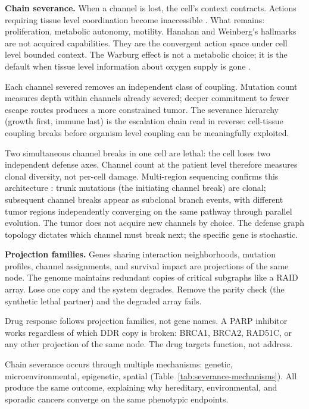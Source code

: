 \documentclass[11pt]{article}
\begin{document}
\textbf{Chain severance.}
When a channel is lost, the cell's context contracts. Actions
requiring tissue level coordination become inaccessible
\cite{McCarthy2026_BCA}. What remains: proliferation,
metabolic autonomy, motility. Hanahan and Weinberg's hallmarks
\cite{Hanahan2011} are not acquired capabilities. They are the
convergent action space under cell level bounded context. The
Warburg effect is not a metabolic choice; it is the default when
tissue level information about oxygen supply is gone
\cite{Warburg1956}.

Each channel severed removes an independent class of coupling.
Mutation count measures depth within channels already severed;
deeper commitment to fewer escape routes produces a more
constrained tumor. The severance hierarchy (growth first, immune
last) is the escalation chain read in reverse: cell-tissue coupling
breaks before organism level coupling can be meaningfully exploited.

Two simultaneous channel breaks in one cell are lethal: the cell
loses two independent defense axes. Channel count at the patient
level therefore measures clonal diversity, not per-cell damage.
Multi-region sequencing confirms this architecture
\cite{Gerlinger2012, JamalHanjani2017}: trunk mutations (the
initiating channel break) are clonal; subsequent channel breaks
appear as subclonal branch events, with different tumor regions
independently converging on the same pathway through parallel
evolution. The tumor does not acquire new channels by choice. The
defense graph topology dictates which channel must break next; the
specific gene is stochastic.

\textbf{Projection families.}
Genes sharing interaction neighborhoods, mutation profiles, channel
assignments, and survival impact are projections of the same node.
The genome maintains redundant copies of critical subgraphs like a
RAID array. Lose one copy and the system degrades. Remove the parity
check (the synthetic lethal partner) and the degraded array fails.

Drug response follows projection families, not gene names. A PARP
inhibitor works regardless of which DDR copy is broken: BRCA1,
BRCA2, RAD51C, or any other projection of the same node. The drug
targets function, not address.

Chain severance occurs through multiple mechanisms: genetic, micro\-environmental,
epigenetic, spatial (Table~\ref{tab:severance-mechanisms}). All
produce the same outcome, explaining why hereditary, environmental,
and sporadic cancers converge on the same phenotypic endpoints.
\end{document}
